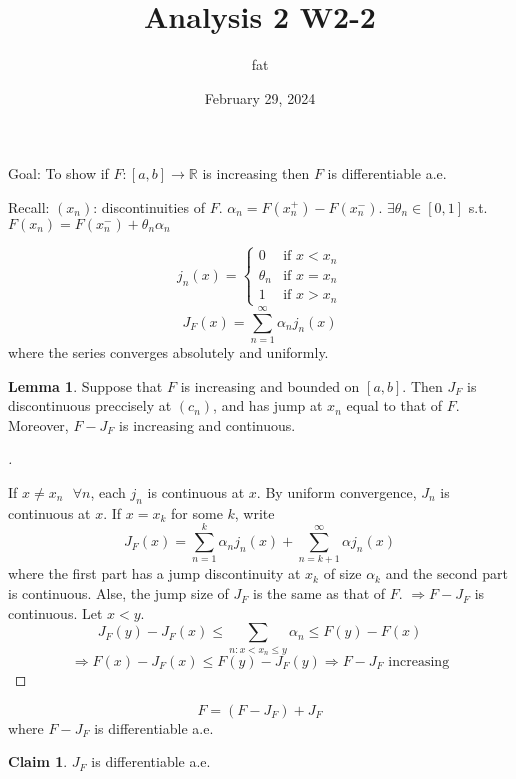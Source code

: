 \documentclass{article}
\title{Analysis 2 W2-2}
\author{fat}
\date{February 29, 2024}
\newcommand{\sfa}{\text{  } \forall}
\theoremstyle{definition}
\newtheorem{lem}{Lemma}
\newtheorem*{clm}{Claim}
\newenvironment{proofs}[1][\proofname]{%
  \begin{proof}[#1]$ $\par\nobreak\ignorespaces
}{%
  \end{proof}
}
\begin{document}
\maketitle
\thispagestyle{fancy}
\renewcommand{\footrulewidth}{0.4pt}
\cfoot{\thepage}
\renewcommand{\headrulewidth}{0.4pt}

\par Goal: To show if $F:[a, b] \to \mathbb{R}$ is increasing then $F$ is differentiable a.e.

\par Recall: $(x_n)$: discontinuities of $F$. $\alpha_n = F(x_n^+) - F(x_n^-)$. $\exists \theta_n \in [0, 1]$ s.t. $F(x_n) = F(x_n^-) + \theta_n \alpha_n$

\[
  j_n(x) = 
  \begin{cases}
    0 & \text{if } x < x_n\\
    \theta_n & \text{if } x = x_n\\
    1 & \text{if } x > x_n
  \end{cases}
\]
\[
  J_F(x) = \sum_{n = 1}^\infty \alpha_n j_n(x) 
\]
where the series converges absolutely and uniformly.

\begin{lem}
  Suppose that $F$ is increasing and bounded on $[a, b]$. Then $J_F$ is discontinuous preccisely at $(c_n)$, and has jump at $x_n$ equal to that of $F$. Moreover, $F - J_F$ is increasing and continuous. 
\end{lem}

\begin{proofs}
  If $x \neq x_n \sfa n$, each $j_n$ is continuous at $x$. By uniform convergence, $J_n$ is continuous at $x$. If $x = x_k$ for some $k$, write 
  \[
    J_F(x) = \sum_{n = 1}^k \alpha_n j_n(x) + \sum_{n = k + 1}^{\infty} \alpha j_n(x)
  \]
  where the first part has a jump discontinuity at $x_k$ of size $\alpha_k$ and the second part is continuous. Alse, the jump size of $J_F$ is the same as that of $F$. $\Rightarrow F - J_F$ is continuous. Let $x < y$. 
  \[
    J_F(y) - J_F(x) \leq \sum_{n: x < x_n \leq y} \alpha_n \leq F(y) - F(x)
  \]
  \[
    \Rightarrow F(x) - J_F(x) \leq F(y) - J_F(y) \Rightarrow F - J_F \text{ increasing}
  \]
\end{proofs}

\[
  F = (F - J_F) + J_F
\]
where $F - J_F$ is differentiable a.e.

\begin{clm}
  $J_F$ is differentiable a.e.
\end{clm}
\end{document}
